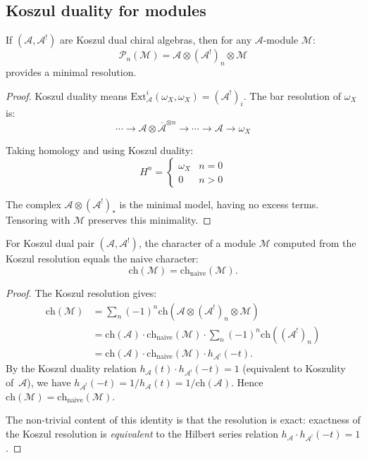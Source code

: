 \subsection{Koszul duality for modules}

\begin{theorem}
\label{thm:koszul-resolution-module}
If $(\mathcal{A}, \mathcal{A}^!)$ are Koszul dual chiral algebras, then for any $\mathcal{A}$-module $\mathcal{M}$:
\[
\mathcal{P}_n(\mathcal{M}) = \mathcal{A} \otimes (\mathcal{A}^!)_n \otimes \mathcal{M}
\]
provides a minimal resolution.
\end{theorem}

\begin{proof}
Koszul duality means $\text{Ext}^i_{\mathcal{A}}(\omega_X, \omega_X) = (\mathcal{A}^!)_i$. The bar resolution of $\omega_X$ is:
\[
\cdots \to \mathcal{A} \otimes \overline{\mathcal{A}}^{\otimes n} \to \cdots \to \mathcal{A} \to \omega_X
\]

Taking homology and using Koszul duality:
\[
H^n = \begin{cases} \omega_X & n = 0 \\ 0 & n > 0 \end{cases}
\]

The complex $\mathcal{A} \otimes (\mathcal{A}^!)_* $ is the minimal model, having no excess terms. Tensoring with $\mathcal{M}$ preserves this minimality.
\end{proof}

\begin{corollary}\label{cor:character-koszul}
For Koszul dual pair $(\mathcal{A}, \mathcal{A}^!)$, the character of a module $\mathcal{M}$ computed from the Koszul resolution equals the naive character:
\[
\mathrm{ch}(\mathcal{M}) = \mathrm{ch}_{\mathrm{naive}}(\mathcal{M}).
\]
\end{corollary}

\begin{proof}
The Koszul resolution gives:
\begin{align}
\mathrm{ch}(\mathcal{M}) &= \sum_n (-1)^n \mathrm{ch}(\mathcal{A} \otimes (\mathcal{A}^!)_n \otimes \mathcal{M}) \\
&= \mathrm{ch}(\mathcal{A}) \cdot \mathrm{ch}_{\mathrm{naive}}(\mathcal{M}) \cdot \sum_n (-1)^n \mathrm{ch}((\mathcal{A}^!)_n) \\
&= \mathrm{ch}(\mathcal{A}) \cdot \mathrm{ch}_{\mathrm{naive}}(\mathcal{M}) \cdot h_{\mathcal{A}^!}(-t).
\end{align}
By the Koszul duality relation $h_{\mathcal{A}}(t) \cdot h_{\mathcal{A}^!}(-t) = 1$ (equivalent to Koszulity of~$\mathcal{A}$), we have $h_{\mathcal{A}^!}(-t) = 1/h_{\mathcal{A}}(t) = 1/\mathrm{ch}(\mathcal{A})$. Hence $\mathrm{ch}(\mathcal{M}) = \mathrm{ch}_{\mathrm{naive}}(\mathcal{M})$.

The non-trivial content of this identity is that the resolution is exact: exactness of the Koszul resolution is \emph{equivalent} to the Hilbert series relation $h_{\mathcal{A}} \cdot h_{\mathcal{A}^!}(-t) = 1$.
\end{proof}

